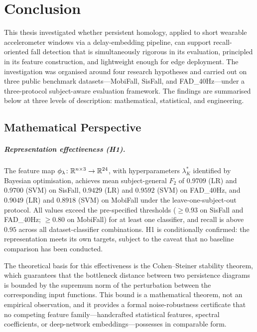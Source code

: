 \chapter{Conclusion}
\label{sec:conclusion}

This thesis investigated whether persistent homology, applied to short wearable
accelerometer windows via a delay-embedding pipeline, can support recall-oriented
fall detection that is simultaneously rigorous in its evaluation, principled in its
feature construction, and lightweight enough for edge deployment.  The investigation
was organised around four research hypotheses and carried out on three public
benchmark datasets---MobiFall, SisFall, and FAD\_40Hz---under a three-protocol
subject-aware evaluation framework.  The findings are summarised below at three
levels of description: mathematical, statistical, and engineering.

\section{Mathematical Perspective}
\label{subsec:conclusion-math}

\paragraph{Representation effectiveness (H1).}
The feature map $\phi_\lambda\colon\mathbb{R}^{n\times 3}\to\mathbb{R}^{24}$, with hyperparameters
$\lambda^*_K$ identified by Bayesian optimisation, achieves mean subject-general
$F_2$ of $0.9709$ (LR) and $0.9700$ (SVM) on SisFall, $0.9429$ (LR) and
$0.9592$ (SVM) on FAD\_40Hz, and $0.9049$ (LR) and $0.8918$ (SVM) on MobiFall
under the leave-one-subject-out protocol.  All values exceed the pre-specified
thresholds ($\geq 0.93$ on SisFall and FAD\_40Hz; $\geq 0.80$ on MobiFall) for at
least one classifier, and recall is above $0.95$ across all dataset-classifier
combinations.  H1 is conditionally confirmed: the representation meets its own
targets, subject to the caveat that no baseline comparison has been conducted.

The theoretical basis for this effectiveness is the Cohen--Steiner stability
theorem, which guarantees that the bottleneck distance between two persistence
diagrams is bounded by the supremum norm of the perturbation between the
corresponding input functions.  This bound is a mathematical theorem, not an
empirical observation, and it provides a formal noise-robustness certificate that
no competing feature family---handcrafted statistical features, spectral
coefficients, or deep-network embeddings---possesses in comparable form.

